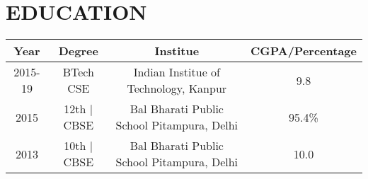 \begin{table}[h]
\section*{EDUCATION}
    \begin{tabular}{ |c|c|c|c| } 
        \hline
        Year & Degree & Institue & CGPA/Percentage \\ 
        \hline
        2015-19 & BTech CSE & Indian Institue of Technology, Kanpur & 9.8\\ 
        2015 & 12th $|$ CBSE & Bal Bharati Public School Pitampura, Delhi & 95.4\%\\ 
        2013 & 10th $|$ CBSE & Bal Bharati Public School Pitampura, Delhi & 10.0\\        
        \hline
    \end{tabular}
\end{table}
